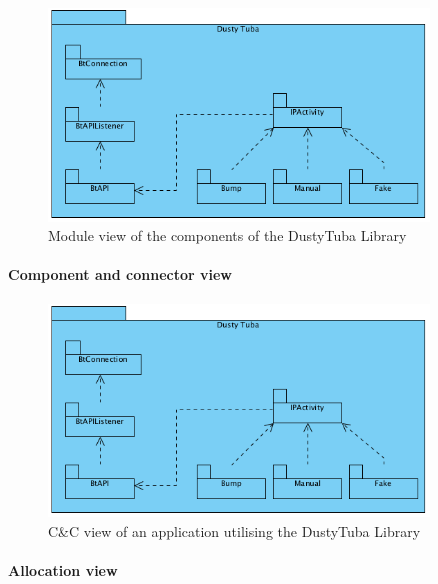 \documentclass[a4paper,11pt]{article}
\begin{document}
\begin{figure}[ht!]
	\begin{center}
	\includegraphics[width=0.9\textwidth]{DustyTubaModuleView.PNG}		
	\end{center}
	\caption{Module view of the components of the DustyTuba Library}
	\label{dtmv}
\end{figure}

\paragraph{Component and connector view}
\begin{figure}[ht!]
	\begin{center}
	\includegraphics[width=0.9\textwidth]{DustyTubaModuleView.PNG}		
	\end{center}
	\caption{C\&C view of an application utilising the DustyTuba Library}
	\label{dtmv}
\end{figure}

\paragraph{Allocation view}

\end{document}

